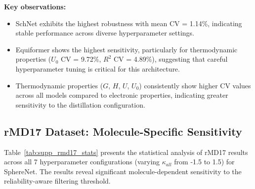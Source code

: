 \textbf{Key observations:}
\begin{itemize}
    \item SchNet exhibits the highest robustness with mean CV = 1.14\%, indicating stable performance across diverse hyperparameter settings.
    \item Equiformer shows the highest sensitivity, particularly for thermodynamic properties ($U_0$ CV = 9.72\%, $R^2$ CV = 4.89\%), suggesting that careful hyperparameter tuning is critical for this architecture.
    \item Thermodynamic properties ($G$, $H$, $U$, $U_0$) consistently show higher CV values across all models compared to electronic properties, indicating greater sensitivity to the distillation configuration.
\end{itemize}

\subsection{rMD17 Dataset: Molecule-Specific Sensitivity}

Table~\ref{tab:supp_rmd17_stats} presents the statistical analysis of rMD17 results across all 7 hyperparameter configurations (varying $\kappa_{all}$ from -1.5 to 1.5) for SphereNet. The results reveal significant molecule-dependent sensitivity to the reliability-aware filtering threshold.

